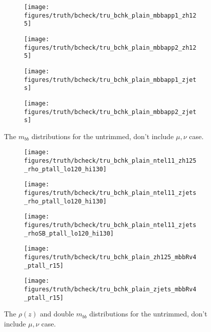 \begin{figure}[!htbp]\captionsetup{justification=centering}
\begin{center}
\begin{subfigure}[t]{18pc}\centering\texttt{[image: figures/truth/bcheck/tru\_bchk\_plain\_mbbapp1\_zh125]}\caption{}\end{subfigure}
\begin{subfigure}[t]{18pc}\centering\texttt{[image: figures/truth/bcheck/tru\_bchk\_plain\_mbbapp2\_zh125]}\caption{}\end{subfigure}
\begin{subfigure}[t]{18pc}\centering\texttt{[image: figures/truth/bcheck/tru\_bchk\_plain\_mbbapp1\_zjets]}\caption{}\end{subfigure}
\begin{subfigure}[t]{18pc}\centering\texttt{[image: figures/truth/bcheck/tru\_bchk\_plain\_mbbapp2\_zjets]}\caption{}\end{subfigure}
\caption{\label{fig:sdbbchkplain}The $m_{bb}$ distributions for the untrimmed, don't include $\mu,\nu$ case.}
\end{center}
\end{figure}

\begin{figure}[!htbp]\captionsetup{justification=centering}
\begin{center}
\begin{subfigure}[t]{18pc}\centering\texttt{[image: figures/truth/bcheck/tru\_bchk\_plain\_ntel11\_zh125\_rho\_ptall\_lo120\_hi130]}\caption{}\end{subfigure}
\begin{subfigure}[t]{18pc}\centering\texttt{[image: figures/truth/bcheck/tru\_bchk\_plain\_ntel11\_zjets\_rho\_ptall\_lo120\_hi130]}\caption{}\end{subfigure}
\begin{subfigure}[t]{18pc}\centering\texttt{[image: figures/truth/bcheck/tru\_bchk\_plain\_ntel11\_zjets\_rhoSB\_ptall\_lo120\_hi130]}\caption{}\end{subfigure}
\begin{subfigure}[t]{18pc}\centering\texttt{[image: figures/truth/bcheck/tru\_bchk\_plain\_zh125\_mbbRv4\_ptall\_r15]}\caption{}\end{subfigure}
\begin{subfigure}[t]{18pc}\centering\texttt{[image: figures/truth/bcheck/tru\_bchk\_plain\_zjets\_mbbRv4\_ptall\_r15]}\caption{}\end{subfigure}
\caption{\label{fig:sdbbchkplain}The $\rho\left(z\right)$ and double $m_{bb}$ distributions for the untrimmed, don't include $\mu,\nu$ case.}
\end{center}
\end{figure}

